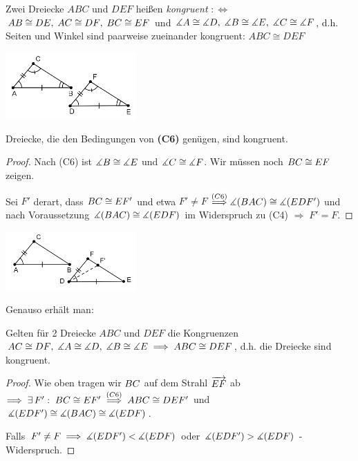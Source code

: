 \begin{defi}
    Zwei Dreiecke $ABC$ und $DEF$ heißen {\em kongruent} $:\Longleftrightarrow$\\
    ${AB} \cong {DE},\; {AC} \cong {DF},\; {BC} \cong {EF}$ und $\mbox{$\measuredangle$}{A}
    \cong \mbox{$\measuredangle$}{D},\; \mbox{$\measuredangle$}{B} \cong \mbox{$\measuredangle$}{E},\; \mbox{$\measuredangle$}{C} \cong \mbox{$\measuredangle$}{F}$, d.h. Seiten und Winkel sind
    paarweise zueinander kongruent: $ABC \cong DEF$
\end{defi}

\centerline{\includegraphics[width=5cm]{BILDER/1-2-09-Kongruenz.png}}

\begin{thm}\label{thm:satz.s1h}
    Dreiecke, die den Bedingungen von {\bf (C6)} genügen, sind kongruent.
\end{thm}

\begin{proof}
    Nach (C6) ist $\mbox{$\measuredangle$} B \cong \mbox{$\measuredangle$} E$ und $\mbox{$\measuredangle$} C \cong \mbox{$\measuredangle$} F$. Wir müssen noch ${BC} \cong
    {EF}$ zeigen.

    Sei $F'$ derart, dass ${BC} \cong {EF'}$ und etwa $F'\neq F$
    $\stackrel{(C6)}{\Longrightarrow} \mbox{$\measuredangle$}(BAC) \cong \mbox{$\measuredangle$}(EDF')$ und nach Voraussetzung $\mbox{$\measuredangle$}(BAC)
    \cong \mbox{$\measuredangle$}(EDF)$ im Widerspruch zu (C4) $\Longrightarrow\; F' = F$.
\end{proof}

\centerline{\includegraphics[width=5cm]{BILDER/1-2-10-SWS.png}}

Genauso erhält man:

\begin{thm}\label{thm:satz.s1i}
    Gelten für 2 Dreiecke $ABC$ und $DEF$ die Kongruenzen ${AC} \cong {DF},\;\mbox{$\measuredangle$} A \cong \mbox{$\measuredangle$}
    D,\; \mbox{$\measuredangle$} B \cong \mbox{$\measuredangle$} E\; \Longrightarrow\; ABC \cong DEF$, d.h. die Dreiecke sind kongruent.
\end{thm}

\begin{proof}
    Wie oben tragen wir ${BC}$ auf dem Strahl $\mbox{${\overrightarrow{EF}}$}$ ab $\Longrightarrow\; \exists\, F':\;
    {BC} \cong {EF'}\; \stackrel{(C6)}{\Longrightarrow} \; ABC \cong DEF'$ und $\mbox{$\measuredangle$}(EDF')
    \cong \mbox{$\measuredangle$}(BAC) \cong \mbox{$\measuredangle$}(EDF)$.

    Falls $F' \neq F\; \Longrightarrow\; \mbox{$\measuredangle$}(EDF') < \mbox{$\measuredangle$}(EDF)$ oder $\mbox{$\measuredangle$}(EDF') > \mbox{$\measuredangle$}(EDF)$ -
    Widerspruch.
\end{proof}

